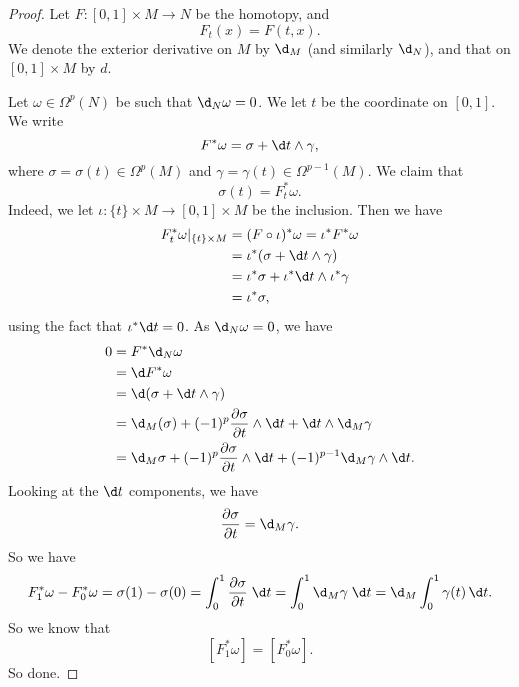 \documentclass[a4paper]{article}
\begin{document}
\begin{proof}
  Let $F: [0, 1] \times M \to N$ be the homotopy, and
  \[
    F_t(x) = F(t, x).
  \]
  We denote the exterior derivative on $M$ by $\d_M$ (and similarly $\d_N$), and that on $[0, 1] \times M$ by $d$.

  Let $\omega \in \Omega^p(N)$ be such that $\d_N \omega = 0$. We let $t$ be the coordinate on $[0, 1]$. We write
  \[
    F^* \omega = \sigma + \d t \wedge \gamma,
  \]
  where $\sigma = \sigma(t) \in \Omega^p(M)$ and $\gamma = \gamma(t) \in \Omega^{p - 1}(M)$. We claim that
  \[
    \sigma(t) = F_t^* \omega.
  \]
  Indeed, we let $\iota: \{t\} \times M \to [0, 1] \times M$ be the inclusion. Then we have
  \begin{align*}
    F_t^* \omega |_{\{t\} \times M} &= (F \circ \iota)^* \omega = \iota^* F^* \omega \\
    &= \iota^* (\sigma + \d t \wedge \gamma)\\
    &= \iota^* \sigma + \iota^* \d t \wedge \iota^* \gamma\\
    &= \iota^* \sigma,
  \end{align*}
  using the fact that $\iota^* \d t = 0$. As $\d_N \omega = 0$, we have
  \begin{align*}
    0 &= F^* \d_N \omega \\
    &= \d F^* \omega \\
    &= \d(\sigma + \d t \wedge \gamma)\\
    &= \d_M(\sigma) + (-1)^p\frac{\partial \sigma}{\partial t} \wedge \d t + \d t \wedge \d_M \gamma\\
    &= \d_M \sigma + (-1)^p \frac{\partial \sigma}{\partial t} \wedge \d t + (-1)^{p - 1} \d_M \gamma \wedge \d t.
  \end{align*}
  Looking at the $\d t$ components, we have
  \[
    \frac{\partial \sigma}{\partial t} = \d_M \gamma.
  \]
  So we have
  \[
    F_1^* \omega - F_0^* \omega = \sigma(1) - \sigma(0) = \int_0^1 \frac{\partial \sigma}{\partial t} \;\d t = \int_0^1 \d_M \gamma \;\d t = \d_M \int_0^1 \gamma(t) \, \d t.
  \]
  So we know that
  \[
    [F_1^* \omega] = [F_0^* \omega].
  \]
  So done.
\end{proof}
\end{document}
